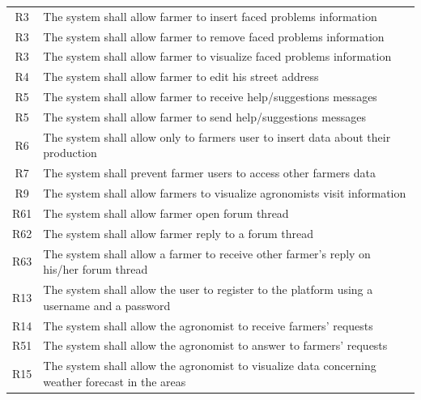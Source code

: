 \begin{center}
\begin{longtable}{|c|m{}|}
            \hline
            \textsc{R3}  &    The system shall allow farmer to insert faced problems information  \\
            \textsc{R3}  &    The system shall allow farmer to remove faced problems information  \\
            \textsc{R3}  &    The system shall allow farmer to visualize faced problems information  \\
            \hline
            \textsc{R4}  &    The system shall allow farmer to edit his street address  \\
            \hline
            \textsc{R5}  &    The system shall allow farmer to receive help/suggestions messages \\
            \textsc{R5}  &    The system shall allow farmer to send help/suggestions messages \\
            \hline
            \textsc{R6}  &    The system shall allow only to farmers user to insert data about their production  \\
            \hline
            \textsc{R7}  &    The system shall prevent farmer users to access other farmers data  \\
            \hline
            \textsc{R9}  &    The system shall allow farmers to visualize agronomists visit information  \\
            \hline
            \textsc{R61}  &    The system shall allow farmer open forum thread  \\
            \hline
            \textsc{R62}  &    The system shall allow farmer reply to a forum thread  \\
            \hline
            \textsc{R63}  &    The system shall allow a farmer to receive other farmer's reply on his/her forum thread  \\
            \hline
            \hline
            \hline
            \textsc{R13}  &    The system shall allow the user to register to the platform using a username and a password  \\
            \hline
            \textsc{R14}  &    The system shall allow the agronomist to receive farmers' requests  \\
            \hline
            \textsc{R51}  &    The system shall allow the agronomist to answer to farmers' requests  \\
            \hline
            \textsc{R15}  &    The system shall allow the agronomist to visualize data concerning weather forecast in the areas  \\

\end{longtable}
\end{center}
